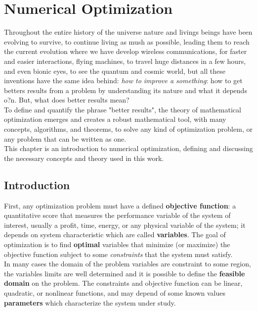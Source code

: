 \section{Numerical Optimization}

Throughout the entire history of the universe  nature and livings beings have been evolving to survive, to continue living as mush as possible, leading them to reach the current evolution where we have develop wireless communications, for faster and easier interactions, flying machines, to travel huge distances in a few hours, and even bionic eyes, to see the quantum and cosmic world, but all these inventions have the same idea behind: \textit{how to improve a something}: how to get betters results from a problem by understanding its nature and what it depends o?n. But, what does better results mean?\\

To define and quantify the phrase "better results", the theory of mathematical optimization emerges and creates a robust mathematical tool, with many concepts, algorithms, and theorems, to solve any kind of optimization problem, or any problem that can be written as one. \\

This chapter is an introduction to numerical optimization, defining and discussing the necessary concepts and theory used in this work. \cite{numerical_opt}

\subsection{Introduction}

First, any optimization problem must have a defined \textbf{objective function}: a quantitative score that measures the performance variable of the system of interest, usually a profit, time, energy, or any physical variable of the system; it depends on system characteristic which are called \textbf{variables}. The goal of optimization is to find \textbf{optimal} variables that minimize (or maximize) the objective function subject to some \textit{constraints} that the system must satisfy.\\

In many cases the domain of the problem variables are constraint to some region, the variables limits are well determined and it is possible to define the \textbf{feasible domain} on the problem. The constraints and objective function can be linear, quadratic, or nonlinear functions, and may depend of some known values \textbf{parameters} which characterize the system under study.\\


